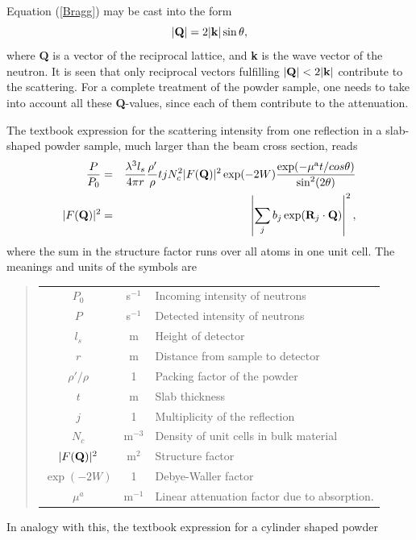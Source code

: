 Equation (\ref{Bragg}) may be cast into the form
\begin{equation}
|{\bf Q}| = 2 |{\bf k}| \sin \theta ,
\end{equation}
where {\bf Q} is a vector of the reciprocal lattice, and {\bf k} is
the wave vector of the neutron. It is seen that only
reciprocal vectors fulfilling $|{\bf Q}| < 2 |{\bf k}|$
contribute to the scattering.
For a complete treatment of the powder sample, one needs to take
into account all these {\bf Q}-values, since each of them contribute
to the attenuation.

The textbook expression for the scattering intensity
from one reflection in a slab-shaped powder sample,
much larger than the beam cross section, reads \cite{bacon}
\begin{eqnarray}
\label{e:slab}
\frac{P}{P_0} &=& \frac{\lambda^3 l_s}{4\pi r} \frac{\rho'}{\rho}
         t j N_c^2 |F({\bf Q})|^2 \exp(-2W)
         \frac{\exp(-\mu^{\rm a} t / cos \theta)}{\sin^2(2\theta)} \\
|F({\bf Q})|^2 &=&
 \left| \sum_j b_j \exp({\bf R}_j \cdot {\bf Q}) \right|^2 ,
\end{eqnarray}
where the sum in the structure factor runs over all atoms in one unit cell.
The meanings and units of the symbols are
%
\begin{quote}\begin{tabular}{ccl}
$P_0$ & s$^{-1}$ & Incoming intensity of neutrons \\
$P$   & s$^{-1}$ & Detected intensity of neutrons \\
$l_s$ & m        & Height of detector \\
$r$   & m        & Distance from sample to detector \\
$\rho'/\rho$ & 1 & Packing factor of the powder \\
$t$   & m        & Slab thickness \\
$j$   & 1        & Multiplicity of the reflection \\
$N_c$ & m$^{-3}$ & Density of unit cells in bulk material\\
$|F({\bf Q})|^2$ & m$^2$  & Structure factor \\
$\exp(-2W)$ & 1  & Debye-Waller factor \\
$\mu^a$ & m$^{-1}$ & Linear attenuation factor due to absorption. \\
\end{tabular}\end{quote}
%
In analogy with this, the textbook expression for a cylinder shaped powder
